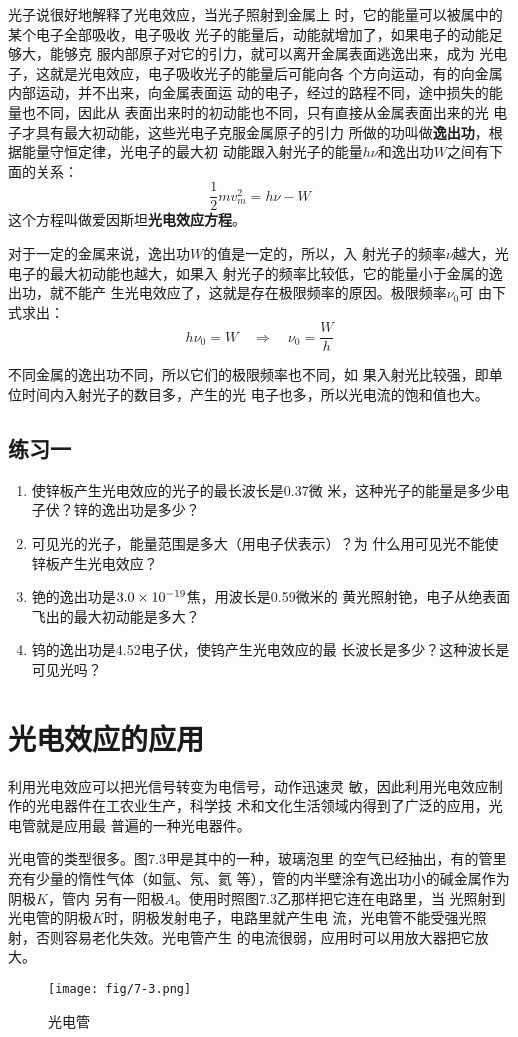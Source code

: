 光子说很好地解释了光电效应，当光子照射到金属上
时，它的能量可以被属中的某个电子全部吸收，电子吸收
光子的能量后，动能就增加了，如果电子的动能足够大，能够克
服内部原子对它的引力，就可以离开金属表面逃逸出来，成为
光电子，这就是光电效应，电子吸收光子的能量后可能向各
个方向运动，有的向金属内部运动，并不出来，向金属表面运
动的电子，经过的路程不同，途中损失的能量也不同，因此从
表面出来时的初动能也不同，只有直接从金属表面出来的光
电子才具有最大初动能，这些光电子克服金属原子的引力
所做的功叫做\textbf{逸出功}，根据能量守恒定律，光电子的最大初
动能跟入射光子的能量$h\nu$和逸出功$W$之间有下面的关系：
\[\frac{1}{2}mv^2_m=h\nu-W \]
这个方程叫做爱因斯坦\textbf{光电效应方程}。

对于一定的金属来说，逸出功$W$的值是一定的，所以，入
射光子的频率$\nu$越大，光电子的最大初动能也越大，如果入
射光子的频率比较低，它的能量小于金属的逸出功，就不能产
生光电效应了，这就是存在极限频率的原因。极限频率$\nu_0$可
由下式求出：
\[h\nu_0=W\quad \Rightarrow\quad \nu_0=\frac{W}{h} \]

不同金属的逸出功不同，所以它们的极限频率也不同，如
果入射光比较强，即单位时间内入射光子的数目多，产生的光
电子也多，所以光电流的饱和值也大。

\subsection*{练习一}

\begin{enumerate}
    \item 使锌板产生光电效应的光子的最长波长是0.37微
米，这种光子的能量是多少电子伏？锌的逸出功是多少？
\item 可见光的光子，能量范围是多大（用电子伏表示）？为
什么用可见光不能使锌板产生光电效应？
\item 铯的逸出功是$3.0\times10^{-19}$焦，用波长是0.59微米的
黄光照射铯，电子从绝表面飞出的最大初动能是多大？
\item 钨的逸出功是4.52电子伏，使钨产生光电效应的最
长波长是多少？这种波长是可见光吗？
\end{enumerate}

\section{光电效应的应用}

利用光电效应可以把光信号转变为电信号，动作迅速灵
敏，因此利用光电效应制作的光电器件在工农业生产，科学技
术和文化生活领域内得到了广泛的应用，光电管就是应用最
普遍的一种光电器件。

光电管的类型很多。图7.3甲是其中的一种，玻璃泡里
的空气已经抽出，有的管里充有少量的惰性气体（如氩、氖、氦
等），管的内半壁涂有逸出功小的碱金属作为阴极$K$，管内
另有一阳极$A$。使用时照图7.3乙那样把它连在电路里，当
光照射到光电管的阴极$K$时，阴极发射电子，电路里就产生电
流，光电管不能受强光照射，否则容易老化失效。光电管产生
的电流很弱，应用时可以用放大器把它放大。
\begin{figure}[htp]\centering
    \texttt{[image: fig/7-3.png]}
    \caption{光电管}
    \end{figure}

